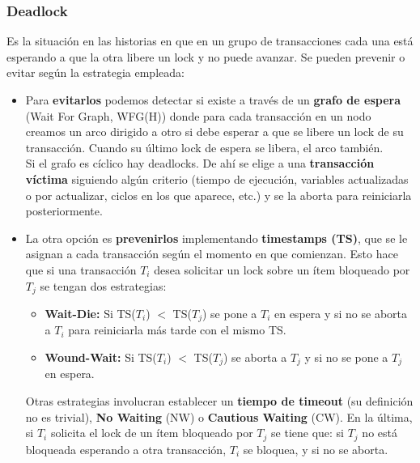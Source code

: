 \subsubsection*{Deadlock}
Es la situación en las historias en que en un grupo de transacciones cada una está esperando a que la otra libere un lock y no puede avanzar. Se pueden prevenir o evitar según la estrategia empleada:
\begin{itemize}
    \item Para \textbf{evitarlos} podemos detectar si existe a través de un \textbf{grafo de espera} (Wait For Graph, WFG(H)) donde para cada transacción en un nodo creamos un arco dirigido a otro si debe esperar a que se libere un lock de su transacción. Cuando su último lock de espera se libera, el arco también. \\
    Si el grafo es cíclico hay deadlocks. De ahí se elige a una \textbf{transacción víctima} siguiendo algún criterio (tiempo de ejecución, variables actualizadas o por actualizar, ciclos en los que aparece, etc.) y se la aborta para reiniciarla posteriormente.
    \item La otra opción es \textbf{prevenirlos} implementando \textbf{timestamps (TS)}, que se le asignan a cada transacción según el momento en que comienzan. Esto hace que si una transacción $T_i$ desea solicitar un lock sobre un ítem bloqueado por $T_j$ se tengan dos estrategias:
    \begin{itemize}
        \item \textbf{Wait-Die:} Si TS($T_i$) $<$ TS($T_j$) se pone a $T_i$ en espera y si no se aborta a $T_i$ para reiniciarla más tarde con el mismo TS.
        \item \textbf{Wound-Wait:} Si TS($T_i$) $<$ TS($T_j$) se aborta a $T_j$ y si no se pone a $T_j$ en espera.
    \end{itemize}
    Otras estrategias involucran establecer un \textbf{tiempo de timeout} (su definición no es trivial), \textbf{No Waiting} (NW) o \textbf{Cautious Waiting} (CW). En la última, si $T_i$ solicita el lock de un ítem bloqueado por $T_j$ se tiene que: si $T_j$ no está bloqueada esperando a otra transacción, $T_i$ se bloquea, y si no se aborta.
\end{itemize}

